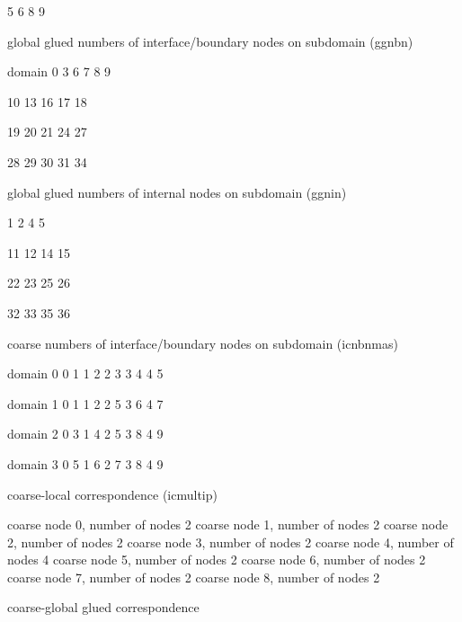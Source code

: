  5 6 8 9


 global glued numbers of interface/boundary nodes on subdomain (ggnbn)

 domain 0
 3 6 7 8 9

 10 13 16 17 18

 19 20 21 24 27

 28 29 30 31 34


 global glued numbers of internal nodes on subdomain (ggnin)

 1 2 4 5

 11 12 14 15

 22 23 25 26

 32 33 35 36


 coarse numbers of interface/boundary nodes on subdomain (icnbnmas)

 domain 0
      0        1
      1        2
      2        3
      3        4
      4        5

 domain 1
      0        1
      1        2
      2        5
      3        6
      4        7

 domain 2
      0        3
      1        4
      2        5
      3        8
      4        9

 domain 3
      0        5
      1        6
      2        7
      3        8
      4        9


 coarse-local correspondence (icmultip)

 coarse node      0, number of nodes  2
 coarse node      1, number of nodes  2
 coarse node      2, number of nodes  2
 coarse node      3, number of nodes  2
 coarse node      4, number of nodes  4
 coarse node      5, number of nodes  2
 coarse node      6, number of nodes  2
 coarse node      7, number of nodes  2
 coarse node      8, number of nodes  2


 coarse-global glued correspondence 

